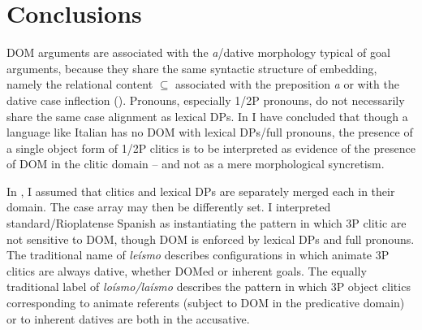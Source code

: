 \documentclass[output=paper,colorlinks,citecolor=brown,nonflat]{./langscibook}
\begin{document}
\section{ Conclusions}\label{sec:manzini:4}

DOM arguments are associated with the \textit{a}/dative morphology typical of goal arguments, because they share the same syntactic structure of embedding, namely the relational content ${\subseteq}$ associated with the preposition \textit{a} or with the dative case inflection (). Pronouns, especially 1/2P pronouns, do not necessarily share the same case alignment as lexical DPs. In  I have concluded that though a language like Italian has no DOM with lexical DPs/full pronouns, the presence of a single object form of 1/2P clitics is to be interpreted as evidence of the presence of DOM in the clitic domain – and not as a mere morphological syncretism.

In , I assumed that clitics and lexical DPs are separately merged each in their domain. The case array may then be differently set. I interpreted standard/Rioplatense Spanish as instantiating the pattern in which 3P clitic are not sensitive to DOM, though DOM is enforced by lexical DPs and full pronouns. The traditional name of \textit{leísmo} describes configurations in which animate 3P clitics are always dative, whether DOMed or inherent goals. The equally traditional label of \textit{loísmo/laísmo} describes the pattern in which 3P object clitics corresponding to animate referents (subject to DOM in the predicative domain) or to inherent datives are both in the accusative. 

\sloppy
\printbibliography[heading=subbibliography,notkeyword=this] 
\end{document}
